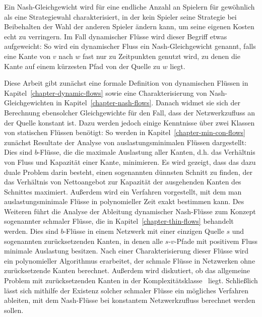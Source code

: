 Ein Nash-Gleichgewicht wird für eine endliche Anzahl an Spielern für gewöhnlich als eine Strategiewahl charakterisiert, in der kein Spieler seine Strategie bei Beibehalten der Wahl der anderen Spieler ändern kann, um seine eigenen Kosten echt zu verringern.
Im Fall dynamischer Flüsse wird dieser Begriff etwas aufgeweicht:
So wird ein dynamischer Fluss ein Nash-Gleichgewicht genannt, falls eine Kante von $v$ nach $w$
fast nur zu Zeitpunkten genutzt wird, zu denen die Kante auf einem kürzesten  Pfad von der Quelle zu $w$ liegt.

Diese Arbeit gibt zunächst eine formale Definition von dynamischen Flüssen in Kapitel~\ref{chapter-dynamic-flows} sowie eine Charakterisierung von Nash-Gleichgewichten in Kapitel~\ref{chapter-nash-flows}.
Danach widmet sie sich der Berechnung ebensolcher Gleichgewichte für den Fall, dass der Netzwerkzufluss an der Quelle konstant ist.
Dazu werden jedoch einige Kenntnisse über zwei Klassen von statischen Flüssen benötigt:
So werden in Kapitel~\ref{chapter-min-con-flows} zunächst Resultate der Analyse von auslastungsminimalen Flüssen dargestellt:
Dies sind $b$-Flüsse, die die maximale Auslastung aller Kanten, d.h. das Verhältnis von Fluss und Kapazität einer Kante, minimieren.
Es wird gezeigt, dass das dazu duale Problem darin besteht, einen sogenannten dünnsten Schnitt zu finden, der das Verhältnis von Nettoangebot zur Kapazität der ausgehenden Kanten des Schnittes maximiert.
Außerdem wird ein Verfahren vorgestellt, mit dem man auslastungsminimale Flüsse in polynomieller Zeit exakt bestimmen kann.
Des Weiteren führt die Analyse der Ableitung dynamischer Nash-Flüsse zum Konzept sogenannter schmaler Flüsse, die in Kapitel~\ref{chapter-thin-flows} behandelt werden.
Dies sind $b$-Flüsse in einem Netzwerk mit einer einzigen Quelle $s$ und sogenannten zurücksetzenden Kanten, in denen alle $s$-$v$-Pfade mit positivem Fluss minimale Auslastung besitzen.
Nach einer Charakterisierung dieser Flüsse wird ein polynomieller Algorithmus erarbeitet, der schmale Flüsse in Netzwerken ohne zurücksetzende Kanten berechnet.
Außerdem wird diskutiert, ob das allgemeine Problem mit zurücksetzenden Kanten in der Komplexitätsklasse \PPAD\ liegt.
Schließlich lässt sich mithilfe der Existenz solcher schmaler Flüsse ein mögliches Verfahren ableiten, mit dem Nash-Flüsse bei konstantem Netzwerkzufluss berechnet werden sollen.

